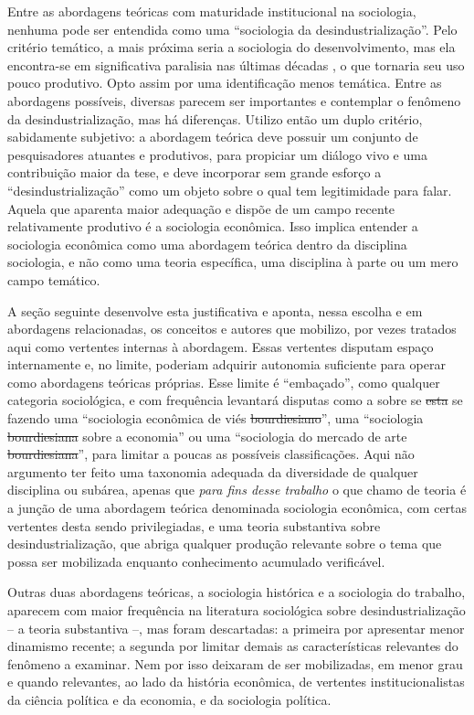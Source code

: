 Entre as abordagens teóricas com maturidade institucional na sociologia, nenhuma pode ser entendida como uma
``sociologia da desindustrialização''. Pelo critério temático, a mais próxima seria a sociologia do desenvolvimento, mas ela encontra-se em significativa paralisia nas últimas décadas , o que tornaria seu uso
pouco produtivo. Opto assim por uma identificação menos temática. Entre as abordagens possíveis, diversas parecem ser importantes e contemplar o fenômeno da desindustrialização, 
mas há diferenças. Utilizo então um duplo critério, sabidamente subjetivo: a abordagem teórica deve possuir um conjunto de pesquisadores
atuantes e produtivos, para propiciar um diálogo vivo e uma contribuição maior da tese, e deve incorporar sem grande esforço a ``desindustrialização'' como um objeto sobre o qual tem legitimidade para falar. Aquela que aparenta maior adequação 
e dispõe de um campo recente relativamente produtivo é a sociologia econômica. Isso implica entender a sociologia econômica como uma abordagem teórica dentro da disciplina sociologia, e não como uma teoria específica, uma disciplina à parte ou um mero campo temático.

A seção seguinte desenvolve esta justificativa e aponta, nessa escolha e em abordagens relacionadas, os conceitos e autores que mobilizo, por vezes tratados aqui como vertentes internas à abordagem. Essas vertentes disputam espaço internamente e, no limite, poderiam adquirir autonomia suficiente para operar como abordagens teóricas próprias. Esse limite é ``embaçado'', como qualquer categoria sociológica, e com frequência levantará disputas como a sobre se \sout{esta} se fazendo uma ``sociologia econômica de viés \sout{bourdiesiano}'', uma ``sociologia \sout{bourdiesiana} sobre a economia'' ou uma ``sociologia do mercado de arte \sout{bourdiesiana}'', para limitar a poucas as possíveis classificações. Aqui não argumento ter feito uma taxonomia adequada da diversidade de qualquer disciplina ou subárea, apenas que \emph{para fins desse trabalho} o que chamo de teoria é a junção de uma abordagem teórica denominada sociologia econômica, com certas vertentes desta sendo privilegiadas, e uma teoria substantiva sobre desindustrialização, que abriga qualquer produção relevante sobre o tema que possa ser mobilizada enquanto conhecimento acumulado verificável.

Outras duas abordagens teóricas, a sociologia histórica e a sociologia do trabalho, aparecem com maior frequência na literatura sociológica sobre desindustrialização -- a teoria substantiva --, mas foram descartadas: a primeira por apresentar menor dinamismo recente; a segunda por limitar demais as características relevantes do fenômeno a examinar. Nem por isso deixaram de ser mobilizadas, em menor grau e quando relevantes, ao lado da história econômica, de vertentes institucionalistas da ciência política e da economia, e da sociologia política.

